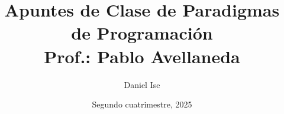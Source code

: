 \documentclass[10pt]{article}
\title{Apuntes de Clase de Paradigmas de Programación\\Prof.: Pablo Avellaneda}
\author{Daniel Ise}
\date{Segundo cuatrimestre, 2025}
\begin{document}
\maketitle
\pagebreak

\tableofcontents
\pagebreak




\end{document}
